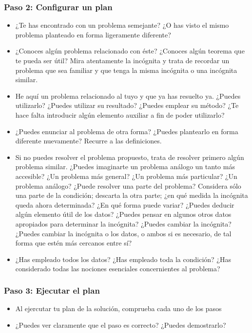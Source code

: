 \subsubsection*{Paso 2: Configurar un plan}
\begin{itemize}
\item ¿Te has encontrado con un problema semejante? ¿O has visto el mismo
  problema planteado en forma ligeramente diferente? 
\item ¿Conoces algún problema relacionado con éste? ¿Conoces algún teorema que
  te pueda ser útil? Mira atentamente la incógnita y trata de recordar un
  problema que sea familiar y que tenga la misma incógnita o una incógnita
  similar. 
\item He aquí un problema relacionado al tuyo y que ya has resuelto ya. ¿Puedes
  utilizarlo? ¿Puedes utilizar su resultado? ¿Puedes emplear su método? ¿Te
  hace falta introducir algún elemento auxiliar a fin de poder utilizarlo? 
\item ¿Puedes enunciar al problema de otra forma? ¿Puedes plantearlo en forma
  diferente nuevamente? Recurre a las definiciones.
\item Si no puedes resolver el problema propuesto, trata de resolver primero
  algún problema similar. ¿Puedes imaginarte un problema análogo un tanto más
  accesible? ¿Un problema más general? ¿Un problema más particular? ¿Un problema
  análogo? ¿Puede resolver una parte del problema? Considera sólo una parte de
  la condición; descarta la otra parte; ¿en qué medida la incógnita queda ahora
  determinada? ¿En qué forma puede variar? ¿Puedes deducir algún
  elemento útil de los datos? ¿Puedes pensar en algunos otros datos apropiados
  para determinar la incógnita? ¿Puedes cambiar la incógnita? ¿Puedes cambiar la
  incógnita o los datos, o ambos si es necesario, de tal forma que estén más
  cercanos entre sí? 
\item ¿Has empleado todos los datos? ¿Has empleado toda la condición? ¿Has
  considerado todas las nociones esenciales concernientes al problema? 
\end{itemize}

\subsubsection*{Paso 3: Ejecutar el plan}
\begin{itemize}
\item Al ejercutar tu plan de la solución, comprueba cada uno de los pasos
\item ¿Puedes ver claramente que el paso es correcto? ¿Puedes demostrarlo? 
\end{itemize}

